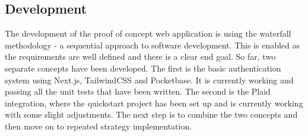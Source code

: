 \subsection{Development}
The development of the proof of concept web application is using the waterfall methodology - a sequential approach to software development. This is enabled as the requirements are well defined and there is a clear end goal. So far, two separate concepts have been developed. The first is the basic authentication system using Next.js, TailwindCSS and Pocketbase. It is currently working and passing all the unit tests that have been written. The second is the Plaid integration, where the quickstart project has been set up and is currently working with some slight adjustments. The next step is to combine the two concepts and then move on to repeated strategy implementation.
